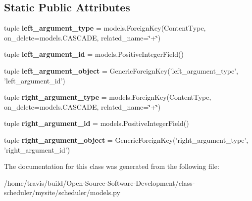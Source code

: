 \subsection*{Static Public Attributes}
\begin{DoxyCompactItemize}
\item 
\hypertarget{classscheduler_1_1models_1_1_user_preference_or_constraint_a0455877d277a31c0561935c7074b664b}{tuple {\bfseries left\-\_\-argument\-\_\-type} = models.\-Foreign\-Key(Content\-Type, on\-\_\-delete=models.\-C\-A\-S\-C\-A\-D\-E, related\-\_\-name=\char`\"{}+\char`\"{})}\label{classscheduler_1_1models_1_1_user_preference_or_constraint_a0455877d277a31c0561935c7074b664b}

\item 
\hypertarget{classscheduler_1_1models_1_1_user_preference_or_constraint_aa1b1f271f6f1f18d5e99996db4840337}{tuple {\bfseries left\-\_\-argument\-\_\-id} = models.\-Positive\-Integer\-Field()}\label{classscheduler_1_1models_1_1_user_preference_or_constraint_aa1b1f271f6f1f18d5e99996db4840337}

\item 
\hypertarget{classscheduler_1_1models_1_1_user_preference_or_constraint_a1880c90f057ecd54a9a484faa30e3df5}{tuple {\bfseries left\-\_\-argument\-\_\-object} = Generic\-Foreign\-Key('left\-\_\-argument\-\_\-type', 'left\-\_\-argument\-\_\-id')}\label{classscheduler_1_1models_1_1_user_preference_or_constraint_a1880c90f057ecd54a9a484faa30e3df5}

\item 
\hypertarget{classscheduler_1_1models_1_1_user_preference_or_constraint_a30dcc18f79528b7860691bced63d3426}{tuple {\bfseries right\-\_\-argument\-\_\-type} = models.\-Foreign\-Key(Content\-Type, on\-\_\-delete=models.\-C\-A\-S\-C\-A\-D\-E, related\-\_\-name=\char`\"{}+\char`\"{})}\label{classscheduler_1_1models_1_1_user_preference_or_constraint_a30dcc18f79528b7860691bced63d3426}

\item 
\hypertarget{classscheduler_1_1models_1_1_user_preference_or_constraint_adbb69d170fd984fe2ec36e340cdf3533}{tuple {\bfseries right\-\_\-argument\-\_\-id} = models.\-Positive\-Integer\-Field()}\label{classscheduler_1_1models_1_1_user_preference_or_constraint_adbb69d170fd984fe2ec36e340cdf3533}

\item 
\hypertarget{classscheduler_1_1models_1_1_user_preference_or_constraint_a3a80b4294939af457c24a9377bc43239}{tuple {\bfseries right\-\_\-argument\-\_\-object} = Generic\-Foreign\-Key('right\-\_\-argument\-\_\-type', 'right\-\_\-argument\-\_\-id')}\label{classscheduler_1_1models_1_1_user_preference_or_constraint_a3a80b4294939af457c24a9377bc43239}

\end{DoxyCompactItemize}


The documentation for this class was generated from the following file\-:\begin{DoxyCompactItemize}
\item 
/home/travis/build/\-Open-\/\-Source-\/\-Software-\/\-Development/class-\/scheduler/mysite/scheduler/models.\-py\end{DoxyCompactItemize}
